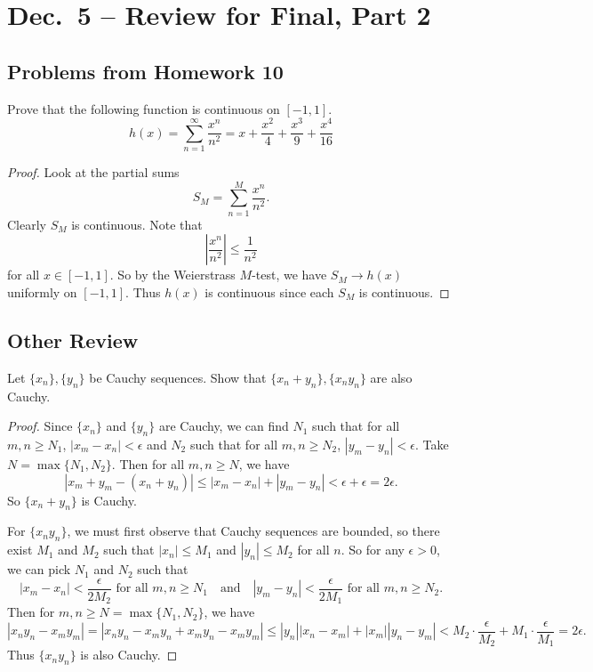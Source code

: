 \chapter{Dec.~5 -- Review for Final, Part 2}

\section{Problems from Homework 10}

\begin{exercise}
  Prove that the following function is continuous on
  $[-1, 1]$.
  \[h(x) = \sum_{n = 1}^\infty \frac{x^n}{n^2} = x + \frac{x^2}{4} + \frac{x^3}{9} + \frac{x^4}{16}\]
\end{exercise}

\begin{proof}
  Look at the partial sums
  \[S_M = \sum_{n = 1}^M \frac{x^n}{n^2}.\]
  Clearly $S_M$ is continuous. Note that
  \[\left|\frac{x^n}{n^2}\right| \le \frac{1}{n^2}\]
  for all $x \in [-1, 1]$. So by the Weierstrass $M$-test,
  we have
  $S_M \to h(x)$ uniformly on $[-1, 1]$.
  Thus $h(x)$ is continuous since each $S_M$ is continuous.
\end{proof}

\section{Other Review}
\begin{exercise}
  Let $\{x_n\}, \{y_n\}$ be Cauchy sequences. Show that
  $\{x_n + y_n\}, \{x_n y_n\}$ are also Cauchy.
\end{exercise}

\begin{proof}
  Since $\{x_n\}$ and $\{y_n\}$ are Cauchy, we can
  find $N_1$ such that for all $m, n \ge N_1$,
  $|x_m - x_n| < \epsilon$ and $N_2$ such that
  for all $m, n \ge N_2$, $|y_m - y_n| < \epsilon$. Take
  $N = \max\{N_1, N_2\}$. Then for all $m, n \ge N$, we have
  \[|x_m + y_m - (x_n + y_n)| \le |x_m - x_n| + |y_m - y_n| < \epsilon + \epsilon = 2\epsilon.\]
  So $\{x_n + y_n\}$ is Cauchy.

  For $\{x_n y_n\}$, we must first
  observe that Cauchy sequences are bounded, so there
  exist $M_1$ and $M_2$ such that $|x_n| \le M_1$ and
  $|y_n| \le M_2$ for all $n$. So for any $\epsilon > 0$,
  we can pick $N_1$ and $N_2$ such that
  \[
    |x_m - x_n| < \frac{\epsilon}{2M_2}
    \text{ for all $m, n \ge N_1$}
    \quad\text{and}\quad
    |y_m - y_n| < \frac{\epsilon}{2M_1}
    \text{ for all $m, n \ge N_2$}.
  \]
  Then for $m, n \ge N = \max\{N_1, N_2\}$, we have
  \[
    |x_n y_n - x_m y_m|
    = |x_n y_n - x_m y_n + x_m y_n - x_m y_m|
    \le |y_n| |x_n - x_m| + |x_m| |y_n - y_m|
    < M_2 \cdot \frac{\epsilon}{M_2} + M_1 \cdot \frac{\epsilon}{M_1}
    = 2\epsilon.
  \]
  Thus $\{x_n y_n\}$ is also Cauchy.
\end{proof}

